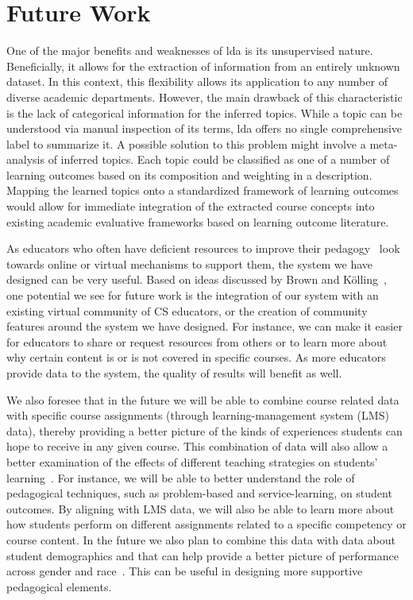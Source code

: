 \section{Future Work}
\label{sec:future-work}


One of the major benefits and weaknesses of \ac{lda} is its unsupervised nature.
Beneficially, it allows for the extraction of information from an entirely unknown dataset.
In this context, this flexibility allows its application to any number of diverse academic departments.
However, the main drawback of this characteristic is the lack of categorical information for the inferred topics.
While a topic can be understood via manual inspection of its terms, \ac{lda} offers no single comprehensive label to summarize it.
A possible solution to this problem might involve a meta-analysis of inferred topics.
Each topic could be classified as one of a number of learning outcomes based on its composition and weighting in a description.
Mapping the learned topics onto a standardized framework of learning outcomes~\cite{krathwohl2002} would allow for immediate integration of the extracted course concepts into existing academic evaluative frameworks based on learning outcome literature.


As educators who often have deficient resources to improve their pedagogy~\cite{Brown2013} look towards online or virtual mechanisms to support them, the system we have designed can be very useful.
Based on ideas discussed by Brown and K\"{o}lling~\cite{Brown2013}, one potential we see for future work is the integration of our system with an existing virtual community of CS educators, or the creation of community features around the system we have designed.
For instance, we can make it easier for educators to share or request resources from others or to learn more about why certain content is or is not covered in specific courses.
As more educators provide data to the system, the quality of results will benefit as well.


We also foresee that in the future we will be able to combine course related data with specific course assignments (through learning-management system (LMS) data), thereby providing a better picture of the kinds of experiences students can hope to receive in any given course.
This combination of data will also allow a better examination of the effects of different teaching strategies on students' learning~\cite{sanderson2000,kay2000,barker2004}.
For instance, we will be able to better understand the role of pedagogical techniques, such as problem-based and service-learning, on student outcomes.
By aligning with LMS data, we will also be able to learn more about how students perform on different assignments related to a specific competency or course content.
In the future we also plan to combine this data with data about student demographics and that can help provide a better picture of performance across gender and race~\cite{katz2006,sahami2010}.
This can be useful in designing more supportive pedagogical elements.
